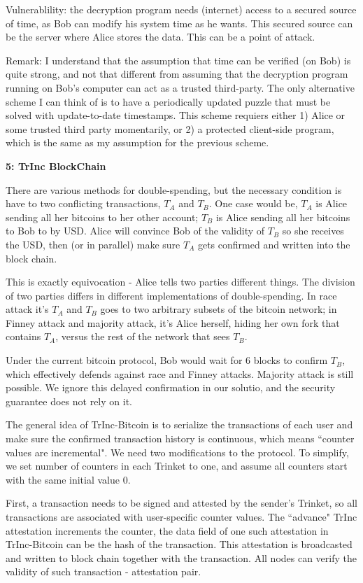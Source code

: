 \documentclass[10pt]{article}
\newcommand\question[2]{\vspace{.1in}\textbf{#1: #2}\vspace{.5em}\vspace{.10in}}
\begin{document}
Vulnerablility: the decryption program needs (internet) access to a secured
source of time, as Bob can modify his system time as he wants. This secured
source can be the server where Alice stores the data. This can be a point of
attack.

Remark: I understand that the assumption that time can be verified (on Bob) is
quite strong, and not that different from assuming that the decryption program
running on Bob's computer can act as a trusted third-party. The only alternative
scheme I can think of is to have a periodically updated puzzle that must be
solved with update-to-date timestamps. This scheme requiers either 1) Alice or
some trusted third party momentarily, or 2) a protected client-side program,
which is the same as my assumption for the previous scheme.


\newpage
\question{5}{TrInc BlockChain}

There are various methods for double-spending, but the necessary condition is
have to two conflicting transactions, $T_A$ and $T_B$. One case would be, $T_A$
is Alice sending all her bitcoins to her other account; $T_B$ is Alice sending
all her bitcoins to Bob to by USD. Alice will convince Bob of the validity of
$T_B$ so she receives the USD, then (or in parallel) make sure $T_A$ gets
confirmed and written into the block chain.

This is exactly equivocation - Alice tells two parties different things.  The
division of two parties differs in different implementations of double-spending.
In race attack it's $T_A$ and $T_B$ goes to two arbitrary subsets of the bitcoin
network; in Finney attack and majority attack, it's Alice herself, hiding her
own fork that contains $T_A$, versus the rest of the network that sees $T_B$.

Under the current bitcoin protocol, Bob would wait for 6 blocks to confirm
$T_B$, which effectively defends against race and Finney attacks. Majority
attack is still possible. We ignore this delayed confirmation in our solutio,
and the security guarantee does not rely on it.

The general idea of TrInc-Bitcoin is to serialize the transactions of each user
and make sure the confirmed transaction history is continuous, which means
``counter values are incremental".  We need two modifications to the protocol.
To simplify, we set number of counters in each Trinket to one, and assume all
counters start with the same initial value $0$.

First, a transaction needs to be signed and attested by the sender's Trinket, so
all transactions are associated with user-specific counter values. The
``advance" TrInc attestation increments the counter, the data field of one such
attestation in TrInc-Bitcoin can be the hash of the transaction. This
attestation is broadcasted and written to block chain together with the
transaction. All nodes can verify the validity of such transaction - attestation
pair.
\end{document}
